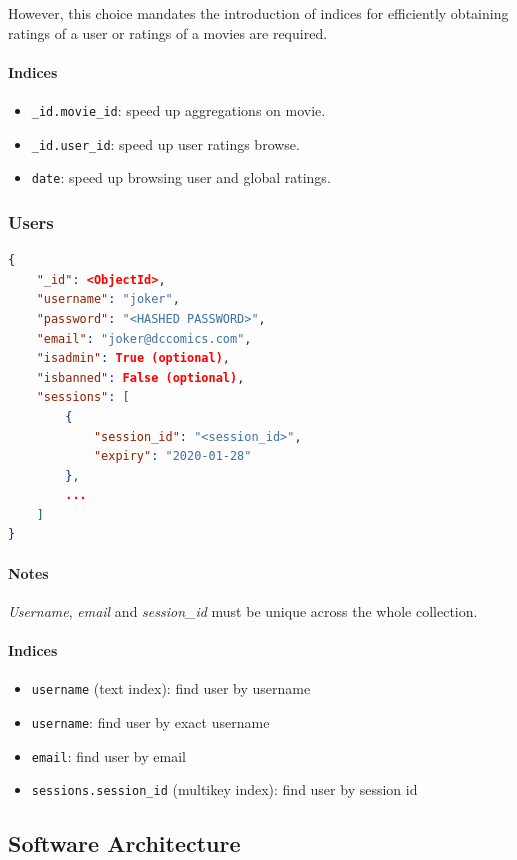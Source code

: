\documentclass[11pt]{article}
\begin{document}
However, this choice mandates the introduction of indices for efficiently 
obtaining ratings of a user or ratings of a movies are required.

\paragraph{Indices} 
\begin{itemize}
	\item \texttt{\_id.movie\_id}: speed up aggregations on movie.
	\item \texttt{\_id.user\_id}: speed up user ratings browse.
	\item \texttt{date}: speed up browsing user and global ratings.
\end{itemize}

\subsubsection{Users}
\label{sec:users}

\begin{lstlisting}[language=json]	
{
	"_id": <ObjectId>,
	"username": "joker",
	"password": "<HASHED PASSWORD>",
	"email": "joker@dccomics.com",
	"isadmin": True (optional),
	"isbanned": False (optional),
	"sessions": [
		{
			"session_id": "<session_id>",
			"expiry": "2020-01-28"
		},
		...
	]
}
\end{lstlisting}
\paragraph{Notes}
\emph{Username}, \emph{email} and \emph{session\_id} must be unique across the whole collection.

\paragraph{Indices} 
\begin{itemize}
	\item \texttt{username} (text index): find user by username
	\item \texttt{username}: find user by exact username
	\item \texttt{email}: find user by email
	\item \texttt{sessions.session\_id} (multikey index): find user by session id
\end{itemize}

\subsection{Software Architecture}
\end{document}
